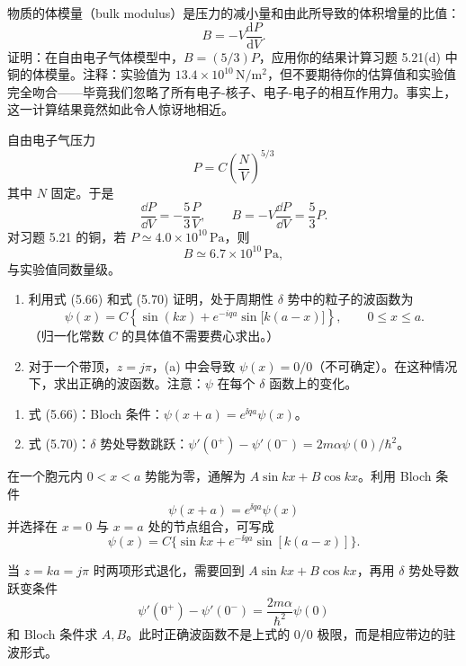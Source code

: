 \begin{question}
物质的体模量（bulk modulus）是压力的减小量和由此所导致的体积增量的比值：
\[
B=-V\frac{\mathrm dP}{\mathrm dV}.
\]
证明：在自由电子气体模型中，$B=(5/3)P$，应用你的结果计算习题 5.21(d) 中铜的体模量。注释：实验值为 $13.4\times10^{10}\,\mathrm{N/m^2}$，但不要期待你的估算值和实验值完全吻合——毕竟我们忽略了所有电子-核子、电子-电子的相互作用力。事实上，这一计算结果竟然如此令人惊讶地相近。
\end{question}
\begin{solution}

自由电子气压力
\[
P=C\left(\frac NV\right)^{5/3}
\]
其中 $N$ 固定。于是
\[
\frac{\dd P}{\dd V}=-\frac53\frac{P}{V},
\qquad
B=-V\frac{\dd P}{\dd V}=\frac53P.
\]
对习题 5.21 的铜，若 $P\simeq4.0\times10^{10}\,\mathrm{Pa}$，则
\[
B\simeq6.7\times10^{10}\,\mathrm{Pa},
\]
与实验值同数量级。

\end{solution}

\begin{question}
\begin{enumerate}
\item 利用式 (5.66) 和式 (5.70) 证明，处于周期性 $\delta$ 势中的粒子的波函数为
\[
\psi(x)=C\left\{\sin(kx)+e^{-iqa}\sin\bigl[k(a-x)\bigr]\right\},\qquad 0\le x\le a.
\]
（归一化常数 $C$ 的具体值不需要费心求出。）
\item 对于一个带顶，$z=j\pi$，(a) 中会导致 $\psi(x)=0/0$（不可确定）。在这种情况下，求出正确的波函数。注意：$\psi$ 在每个 $\delta$ 函数上的变化。
\end{enumerate}

\par\smallskip
{}
\begin{enumerate}[leftmargin=2.2em,itemsep=0.12em,topsep=0.12em,parsep=0pt]
\item 式 (5.66)：Bloch 条件：$\psi(x+a)=e^{\ii qa}\psi(x)$。
\item 式 (5.70)：$\delta$ 势处导数跳跃：$\psi'(0^+)-\psi'(0^-)=2m\alpha\psi(0)/\hbar^2$。
\end{enumerate}

\end{question}
\begin{solution}

在一个胞元内 $0<x<a$ 势能为零，通解为 $A\sin kx+B\cos kx$。利用 Bloch 条件
\[
\psi(x+a)=e^{\ii qa}\psi(x)
\]
并选择在 $x=0$ 与 $x=a$ 处的节点组合，可写成
\[
\psi(x)=C\{\sin kx+e^{-\ii qa}\sin[k(a-x)]\}.
\]

当 $z=ka=j\pi$ 时两项形式退化，需要回到 $A\sin kx+B\cos kx$，再用 $\delta$ 势处导数跃变条件
\[
\psi'(0^+)-\psi'(0^-)=\frac{2m\alpha}{\hbar^2}\psi(0)
\]
和 Bloch 条件求 $A,B$。此时正确波函数不是上式的 $0/0$ 极限，而是相应带边的驻波形式。

\end{solution}

